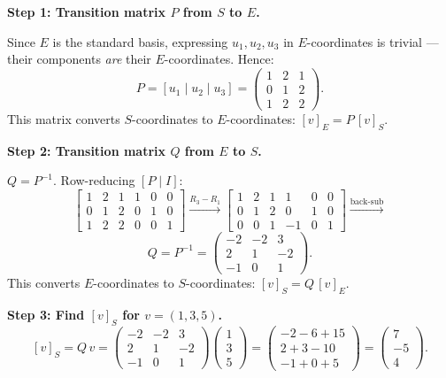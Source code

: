 \documentclass[12pt,a3paper]{article}
\begin{document}
\begin{tcolorbox}[enhanced,breakable,
  colback=cC!4,colframe=cC,boxrule=0.8pt,arc=5pt,
  title={\textbf{Answer --- Transition Matrices \& Coordinate Vector}},
  fonttitle=\bfseries\color{white},colbacktitle=cC]

\textbf{Step 1: Transition matrix $P$ from $S$ to $E$.}

Since $E$ is the standard basis, expressing $u_1, u_2, u_3$ in $E$-coordinates is trivial --- their components \emph{are} their $E$-coordinates. Hence:
\[
P = [u_1 \mid u_2 \mid u_3] =
\begin{pmatrix}1 & 2 & 1\\0 & 1 & 2\\1 & 2 & 2\end{pmatrix}.
\]
This matrix converts $S$-coordinates to $E$-coordinates: $[v]_E = P\,[v]_S$.

\medskip
\textbf{Step 2: Transition matrix $Q$ from $E$ to $S$.}

$Q = P^{-1}$. Row-reducing $[P \mid I]$:
\[
\left[\begin{array}{ccc|ccc}
1&2&1&1&0&0\\0&1&2&0&1&0\\1&2&2&0&0&1
\end{array}\right]
\xrightarrow{R_3-R_1}
\left[\begin{array}{ccc|ccc}
1&2&1&1&0&0\\0&1&2&0&1&0\\0&0&1&-1&0&1
\end{array}\right]
\xrightarrow{\text{back-sub}}
\]
\[
Q = P^{-1} = \begin{pmatrix}-2 & -2 & 3\\2 & 1 & -2\\-1 & 0 & 1\end{pmatrix}.
\]
This converts $E$-coordinates to $S$-coordinates: $[v]_S = Q\,[v]_E$.

\medskip
\textbf{Step 3: Find $[v]_S$ for $v = (1,3,5)$.}
\[
[v]_S = Q\,v =
\begin{pmatrix}-2&-2&3\\2&1&-2\\-1&0&1\end{pmatrix}
\begin{pmatrix}1\\3\\5\end{pmatrix}
=\begin{pmatrix}-2-6+15\\2+3-10\\-1+0+5\end{pmatrix}
=\begin{pmatrix}7\\-5\\4\end{pmatrix}.
\]


\end{tcolorbox}
\end{document}
